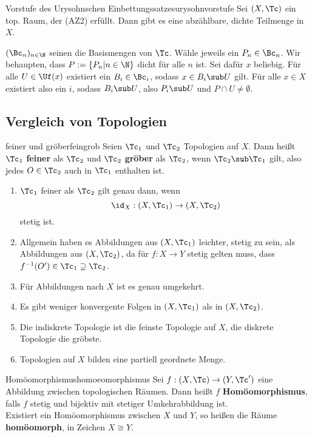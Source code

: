 \begin{satz}{Vorstufe des Urysohnschen Einbettungssatzes}{urysohnvorstufe}
Sei $(X, \Tc)$ ein top. Raum, der (AZ2) erfüllt. Dann gibt es eine abzählbare, dichte Teilmenge in $X$.
\end{satz}
\begin{beweis}
$(\Bc_n)_{n \in \N}$ seinen die Basismengen von $\Tc$. Wähle jeweils ein $P_n \in \Bc_n$. Wir behaupten, dass $P := \{P_n | n \in \N \}$ dicht für alle $n$ ist. Sei dafür $x$ beliebig. Für alle $U \in \Uf(x)$ existiert ein $B_i \in \Bc_i$, sodass $x \in B_i \sub U$ gilt. Für alle $x \in X$ existiert also ein $i$, sodass $B_i \sub U$, also $P_i \sub U$ und $P \cap U \neq \emptyset$.
\end{beweis}
\subsection{Vergleich von Topologien}
\label{subsec:vergleichvontopo}
\begin{definition}{feiner und gröber}{feingrob}
Seien $\Tc_1$ und $\Tc_2$ Topologien auf $X$. Dann heißt $\Tc_1$ \textbf{feiner} als $\Tc_2$ und $\Tc_2$ \textbf{gröber} als $\Tc_2$, wenn $\Tc_2 \sub \Tc_1$ gilt, also jedes $O \in \Tc_2$ auch in $\Tc_1$ enthalten ist.
\end{definition}
\begin{bemerkungen}
\begin{enumerate}
\item $\Tc_1$ feiner als $\Tc_2$ gilt genau dann, wenn 
\begin{equation}
\id_X: (X, \Tc_1) \to (X, \Tc_2)
\end{equation}
stetig ist.
\item Allgemein haben es Abbildungen aus $(X, \Tc_1)$ leichter, stetig zu sein, als Abbildungen aus $(X, \Tc_2)$, da für $f: X \to Y$ stetig gelten muss, dass $f^{-1}(O') \in \Tc_1 \supseteq \Tc_2$.
\item Für Abbildungen nach $X$ ist es genau umgekehrt.
\item Es gibt weniger konvergente Folgen in $(X,\Tc_1)$ als in $(X, \Tc_2)$.
\item Die indiskrete Topologie ist die feinste Topologie auf $X$, die diskrete Topologie die gröbste.
\item Topologien auf $X$ bilden eine partiell geordnete Menge.
\end{enumerate}
\end{bemerkungen}
\begin{definition}{Homöomorphismus}{homoeomorphismus}
Sei $f: (X, \Tc) \to (Y, \Tc')$ eine Abbildung zwischen topologischen Räumen. Dann heißt $f$ \textbf{Homöomorphismus}, falls $f$ stetig und bijektiv mit stetiger Umkehrabbildung ist.\\
Existiert ein Homöomorphismus zwischen $X$ und $Y$, so heißen die Räume \textbf{homöomorph}, in Zeichen $X \cong Y$.
\end{definition}
